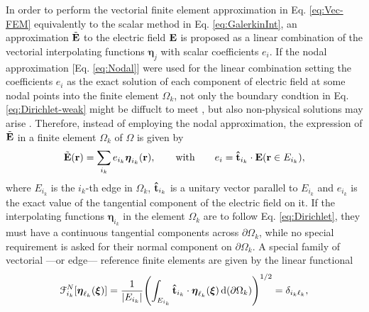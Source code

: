 
 In order to perform the vectorial finite element approximation in Eq. \eqref{eq:Vec-FEM} equivalently to the scalar method in Eq. \eqref{eq:GalerkinInt}, an approximation $\tilde{\vb{E}}$ to the electric field $\vb{E}$ is proposed as a linear combination of the vectorial interpolating functions $\boldsymbol{\eta}_j$ with scalar coefficients $e_i$. If the nodal approximation [Eq. \eqref{eq:Nodal}] were used for the linear combination setting the coefficients $e_i$ as the exact solution of each component of  electric field at some nodal points into the finite element $\Omega_k$, not only the boundary condtion in Eq. \eqref{eq:Dirichlet-weak} might be diffuclt to meet \cite{larson_finite_2013,jin_theory_2010}, but also   non-physical solutions may arise \cite{bondeson_computational_2005}. Therefore, instead of employing the nodal approximation, the expression of $\tilde{\vb{E}}$ in a finite element $\Omega_k$ of $\Omega$ is given by \cite{larson_finite_2013}
%
%
%
\begin{align}
    \tilde{\vb{E}}(\vb{r}) = \sum_{i_k} e_{i_k} \boldsymbol{\eta}_{i_k}(\vb{r}),
        \qquad
        \text{with}
        \qquad
    e_{i} = \vu{t}_{i_k}\cdot \vb{E}(\vb{r}\in E_{i_k}),
\end{align}
%
where $E_{i_k}$ is the ${i_k}$-th edge in $\Omega_k$, $\vu{t}_{i_k}$ is a unitary vector  parallel to $E_{i_k}$ and $e_{i_k}$ is the exact value of the tangential component of the electric field on it. If the interpolating functions  $\boldsymbol{\eta}_{i_k}$ in the element $\Omega_k$ are to follow Eq. \eqref{eq:Dirichlet}, they  must have a continuous tangential components across $\partial\Omega_k$, while no special requirement is asked for their normal component on $\partial\Omega_k$. A special family of vectorial ---or edge--- reference finite elements are given by the linear functional \cite{larson_finite_2013}
%
%
\begin{align}
    \mathcal{F}^{N}_{i_k}[\boldsymbol{\eta}_{\ell_k}(\boldsymbol{\xi})] = \frac{1}{\abs{E_{i_k}}}\qty(\int_{E_{i_k}} \vu{t}_{i_k}\cdot\boldsymbol{\eta}_{\ell_k}(\boldsymbol{\xi})   \dd{(\partial\Omega_k)} )^{1/2}  = \delta_{{i_k}{\ell_k}},
    \label{eq:Nedelec}
\end{align}
